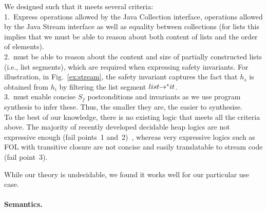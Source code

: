 \documentclass[runningheads,a4paper]{llncs}
\begin{document}
We designed \logic such that it meets several criteria:\\ 
%
1.~Express operations allowed by the Java Collection interface,
operations allowed by the Java Stream interface as well as equality
between collections (for lists this implies that we must be able to
reason about both content of lists and the order of elements).\\
%
2.~\logic must be able to reason about the content and size of
partially constructed lists (i.e., list segments), which are required
when expressing safety invariants. 
For illustration, in Fig.~\ref{ex:stream}, the safety invariant captures the fact that 
$h_s$ is obtained from $h_i$ by filtering the list segment $list {\rightarrow^*} it$.\\
%
3.~\logic must enable concise $S_f$ postconditions and invariants as
we use program synthesis to infer these.  Thus, the smaller they are, the
easier to synthesise.\\
%
 
To the best of our knowledge, there is no existing logic that meets all the
criteria above.  The majority of recently developed decidable heap logics
are not expressive enough (fail points~1
and~2)~\cite{DBLP:conf/cav/ItzhakyBINS13, DBLP:conf/cav/PiskacWZ13,
DBLP:conf/esop/BrainDKS14, DBLP:conf/popl/MadhusudanPQ11,
DBLP:conf/atva/BouajjaniDES12, DBLP:conf/lpar/DavidKL15}, whereas very
expressive logics such as FOL with transitive closure are not concise and
easily translatable to stream code (fail point~3).

While our theory is undecidable, we found it works well for our 
particular use case.


\paragraph{Semantics.}
\end{document}
